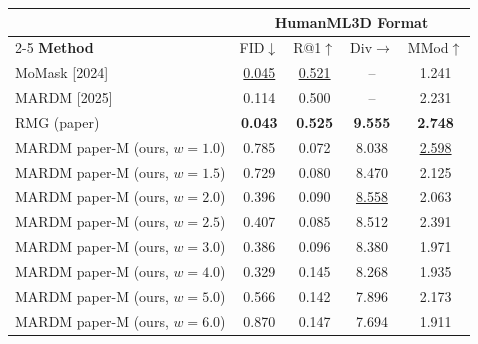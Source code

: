 \begin{tabular}{l|cccc}
\hline\hline
 & \multicolumn{4}{c}{\textbf{HumanML3D Format}} \\
\cline{2-5}
\textbf{Method} & FID$\downarrow$ & R@1$\uparrow$ & Div$\rightarrow$ & MMod$\uparrow$ \\
\hline
MoMask [2024] & \underline{0.045} & \underline{0.521} & -- & 1.241 \\
MARDM [2025] & 0.114 & 0.500 & -- & 2.231 \\
RMG (paper) & \textbf{0.043} & \textbf{0.525} & \textbf{9.555} & \textbf{2.748} \\
\hline
MARDM paper-M (ours, $w=1.0$) & 0.785 & 0.072 & 8.038 & \underline{2.598} \\
MARDM paper-M (ours, $w=1.5$) & 0.729 & 0.080 & 8.470 & 2.125 \\
MARDM paper-M (ours, $w=2.0$) & 0.396 & 0.090 & \underline{8.558} & 2.063 \\
MARDM paper-M (ours, $w=2.5$) & 0.407 & 0.085 & 8.512 & 2.391 \\
MARDM paper-M (ours, $w=3.0$) & 0.386 & 0.096 & 8.380 & 1.971 \\
MARDM paper-M (ours, $w=4.0$) & 0.329 & 0.145 & 8.268 & 1.935 \\
MARDM paper-M (ours, $w=5.0$) & 0.566 & 0.142 & 7.896 & 2.173 \\
MARDM paper-M (ours, $w=6.0$) & 0.870 & 0.147 & 7.694 & 1.911 \\
\hline\hline
\end{tabular}
